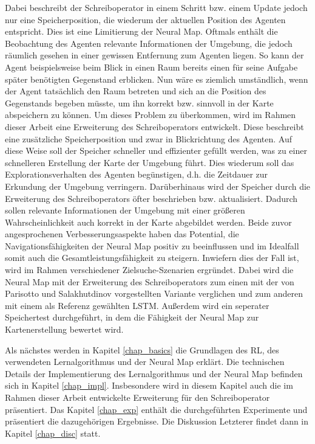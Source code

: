 Dabei beschreibt der Schreiboperator in einem Schritt bzw. einem Update jedoch nur eine Speicherposition, die wiederum der aktuellen Position des Agenten entspricht. Dies ist eine Limitierung der Neural Map. Oftmals enthält die Beobachtung des Agenten relevante Informationen der Umgebung, die jedoch räumlich gesehen in einer gewissen Entfernung zum Agenten liegen. So kann der Agent beispielsweise beim Blick in einen Raum bereits einen für seine Aufgabe später benötigten Gegenstand erblicken. Nun wäre es ziemlich umständlich, wenn der Agent tatsächlich den Raum betreten und sich an die Position des Gegenstands begeben müsste, um ihn korrekt bzw. sinnvoll in der Karte abspeichern zu können. Um dieses Problem zu überkommen, wird im Rahmen dieser Arbeit eine Erweiterung des Schreiboperators entwickelt. Diese beschreibt eine zusätzliche Speicherposition und zwar in Blickrichtung des Agenten. Auf diese Weise soll der Speicher schneller und effizienter gefüllt werden, was zu einer schnelleren Erstellung der Karte der Umgebung führt. Dies wiederum soll das Explorationsverhalten des Agenten begünstigen, d.h. die Zeitdauer zur Erkundung der Umgebung verringern. Darüberhinaus wird der Speicher durch die Erweiterung des Schreiboperators öfter beschrieben bzw. aktualisiert. Dadurch sollen relevante Informationen der Umgebung mit einer größeren Wahrscheinlichkeit auch korrekt in der Karte abgebildet werden. Beide zuvor angesprochenen Verbesserungsaspekte haben das Potential, die Navigationsfähigkeiten der Neural Map positiv zu beeinflussen und im Idealfall somit auch die Gesamtleistungsfähigkeit zu steigern. Inwiefern dies der Fall ist, wird im Rahmen verschiedener Zielsuche-Szenarien ergründet. Dabei wird die Neural Map mit der Erweiterung des Schreiboperators zum einen mit der von Parisotto und Salakhutdinov vorgestellten Variante verglichen und zum anderen mit einem als Referenz gewählten LSTM. Außerdem wird ein seperater Speichertest durchgeführt, in dem die Fähigkeit der Neural Map zur Kartenerstellung bewertet wird.

Als nächstes werden in Kapitel \ref{chap_basics} die Grundlagen des RL, des verwendeten Lernalgorithmus und der Neural Map erklärt. Die technischen Details der Implementierung des Lernalgorithmus und der Neural Map befinden sich in Kapitel \ref{chap_impl}. Insbesondere wird in diesem Kapitel auch die im Rahmen dieser Arbeit entwickelte Erweiterung für den Schreiboperator präsentiert. Das Kapitel \ref{chap_exp} enthält die durchgeführten Experimente und präsentiert die dazugehörigen Ergebnisse. Die Diskussion Letzterer findet dann in Kapitel \ref{chap_disc} statt.


















